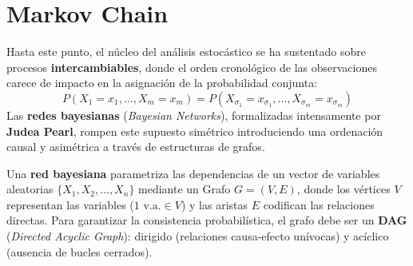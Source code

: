 
\chapter{Markov Chain}
Hasta este punto, el núcleo del análisis estocástico se ha sustentado sobre procesos \textbf{intercambiables}, donde el orden cronológico de las observaciones carece de impacto en la asignación de la probabilidad conjunta:
\begin{equation*}
    P(X_1 = x_1, \dots, X_m = x_m) = P(X_{\sigma_1} = x_{\sigma_1}, \dots, X_{\sigma_m} = x_{\sigma_m})
\end{equation*}
Las \textbf{redes bayesianas} (\textit{Bayesian Networks}), formalizadas intensamente por \textbf{Judea Pearl}, rompen este supuesto simétrico introduciendo una ordenación causal y asimétrica a través de estructuras de grafos.

\begin{definicion}
    Una \textbf{red bayesiana} parametriza las dependencias de un vector de variables aleatorias $\{X_1, X_2, \dots, X_n\}$ mediante un Grafo $G = (V, E)$, donde los vértices $V$ representan las variables ($1 \text{ v.a.} \in V$) y las aristas $E$ codifican las relaciones directas. Para garantizar la consistencia probabilística, el grafo debe ser un \textbf{DAG} (\textit{Directed Acyclic Graph}): dirigido (relaciones causa-efecto unívocas) y acíclico (ausencia de bucles cerrados).
\end{definicion}

\vspace{0.4cm}

